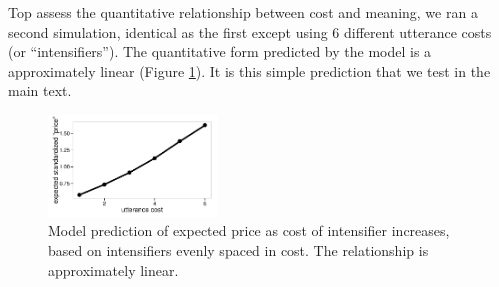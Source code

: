 \documentclass[10pt,letterpaper]{article}
\begin{document}
Top assess the quantitative relationship between cost and meaning, we ran a second simulation, identical as the first except using 6 different utterance costs (or ``intensifiers'').
The quantitative form predicted by the model is a approximately linear (Figure \ref{model-heights}).
It is this simple prediction that we test in the main text.

\begin{figure}[tbh]
\begin{center}\includegraphics[width=0.4\textwidth]{height-by-cost.pdf}
\end{center}
\caption{Model prediction of expected price as cost of intensifier increases, based on intensifiers evenly spaced in cost. The relationship is approximately linear.} 
\label{model-heights}
\end{figure}
\end{document}
